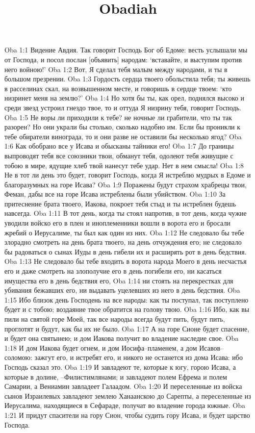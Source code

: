 

\title{Obadiah}

Oba 1:1  Видение Авдия. Так говорит Господь Бог об Едоме: весть услышали мы от Господа, и посол послан [объявить] народам: `вставайте, и выступим против него войною!'
Oba 1:2  Вот, Я сделал тебя малым между народами, и ты в большом презрении.
Oba 1:3  Гордость сердца твоего обольстила тебя; ты живешь в расселинах скал, на возвышенном месте, и говоришь в сердце твоем: `кто низринет меня на землю?'
Oba 1:4  Но хотя бы ты, как орел, поднялся высоко и среди звезд устроил гнездо твое, то и оттуда Я низрину тебя, говорит Господь.
Oba 1:5  Не воры ли приходили к тебе? не ночные ли грабители, что ты так разорен? Но они украли бы столько, сколько надобно им. Если бы проникли к тебе обиратели винограда, то и они разве не оставили бы несколько ягод?
Oba 1:6  Как обобрано все у Исава и обысканы тайники его!
Oba 1:7  До границы выпроводят тебя все союзники твои, обманут тебя, одолеют тебя живущие с тобою в мире, ядущие хлеб твой нанесут тебе удар. Нет в нем смысла!
Oba 1:8  Не в тот ли день это будет, говорит Господь, когда Я истреблю мудрых в Едоме и благоразумных на горе Исава?
Oba 1:9  Поражены будут страхом храбрецы твои, Феман, дабы все на горе Исава истреблены были убийством.
Oba 1:10  За притеснение брата твоего, Иакова, покроет тебя стыд и ты истреблен будешь навсегда.
Oba 1:11  В тот день, когда ты стоял напротив, в тот день, когда чужие уводили войско его в плен и иноплеменники вошли в ворота его и бросали жребий о Иерусалиме, ты был как один из них.
Oba 1:12  Не следовало бы тебе злорадно смотреть на день брата твоего, на день отчуждения его; не следовало бы радоваться о сынах Иуды в день гибели их и расширять рот в день бедствия.
Oba 1:13  Не следовало бы тебе входить в ворота народа Моего в день несчастья его и даже смотреть на злополучие его в день погибели его, ни касаться имущества его в день бедствия его,
Oba 1:14  ни стоять на перекрестках для убивания бежавших его, ни выдавать уцелевших из него в день бедствия.
Oba 1:15  Ибо близок день Господень на все народы: как ты поступал, так поступлено будет и с тобою; воздаяние твое обратится на голову твою.
Oba 1:16  Ибо, как вы пили на святой горе Моей, так все народы всегда будут пить, будут пить, проглотят и будут, как бы их не было.
Oba 1:17  А на горе Сионе будет спасение, и будет она святынею; и дом Иакова получит во владение наследие свое.
Oba 1:18  И дом Иакова будет огнем, и дом Иосифа--пламенем, а дом Исавов--соломою: зажгут его, и истребят его, и никого не останется из дома Исава: ибо Господь сказал это.
Oba 1:19  И завладеют те, которые к югу, горою Исава, а которые в долине, --Филистимлянами; и завладеют полем Ефрема и полем Самарии, а Вениамин завладеет Галаадом.
Oba 1:20  И переселенные из войска сынов Израилевых завладеют землею Ханаанскою до Сарепты, а переселенные из Иерусалима, находящиеся в Сефараде, получат во владение города южные.
Oba 1:21  И придут спасители на гору Сион, чтобы судить гору Исава, и будет царство Господа.


